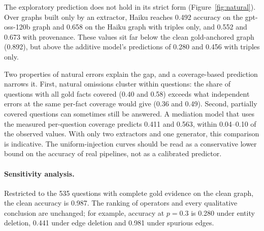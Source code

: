\documentclass[11pt]{article}
\begin{document}
The exploratory prediction does not hold in its strict form (Figure~\ref{fig:natural}). Over graphs built only by an extractor, Haiku reaches 0.492 accuracy on the gpt-oss-120b graph and 0.658 on the Haiku graph with triples only, and 0.552 and 0.673 with provenance. These values sit far below the clean gold-anchored graph (0.892), but above the additive model's predictions of 0.280 and 0.456 with triples only.

Two properties of natural errors explain the gap, and a coverage-based prediction narrows it. First, natural omissions cluster within questions: the share of questions with all gold facts covered (0.40 and 0.58) exceeds what independent errors at the same per-fact coverage would give (0.36 and 0.49). Second, partially covered questions can sometimes still be answered. A mediation model that uses the measured per-question coverage predicts 0.411 and 0.563, within 0.04--0.10 of the observed values. With only two extractors and one generator, this comparison is indicative. The uniform-injection curves should be read as a conservative lower bound on the accuracy of real pipelines, not as a calibrated predictor.

\paragraph{Sensitivity analysis.} Restricted to the 535 questions with complete gold evidence on the clean graph, the clean accuracy is 0.987. The ranking of operators and every qualitative conclusion are unchanged; for example, accuracy at $p=0.3$ is 0.280 under entity deletion, 0.441 under edge deletion and 0.981 under spurious edges.
\end{document}
